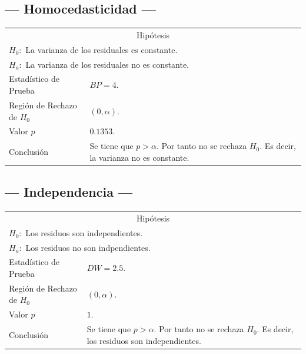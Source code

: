 \documentclass{article}
\begin{document}
\subsection{--- Homocedasticidad ---} %
\begin{center}
  \begin{tabular}{|l|p{8cm}|}
    \cline{1-2}
    \multicolumn{2}{|c|}{Hipótesis}\\ \cline{1-2}
    \multicolumn{2}{|l|}{\(H_0:\) La varianza de los residuales es constante.} \\ 
    \multicolumn{2}{|l|}{\(H_a:\) La varianza de los residuales no es constante.} \\ \cline{1-2}
    Estadístico de Prueba & \(BP = 4\).\\ \cline{1-2} 
		Región de Rechazo de \(H_0\) & \((0, \alpha )\).\\ \cline{1-2} 
    Valor \(p\) & \(0.1353\).\\ \cline{1-2} 
    Conclusión & Se tiene que \(p> \alpha\). \newline 
		Por tanto no se rechaza \(H_0\). \newline 
		Es decir, la varianza no es constante. \\ \cline{1-2} 
  \end{tabular}
\end{center}

\subsection{--- Independencia ---} %
\begin{center}
  \begin{tabular}{|l|p{8cm}|}
    \cline{1-2}
    \multicolumn{2}{|c|}{Hipótesis}\\ \cline{1-2}
    \multicolumn{2}{|l|}{\(H_0:\) Los residuos son independientes.} \\ 
    \multicolumn{2}{|l|}{\(H_a:\) Los residuos no son indpendientes.} \\ \cline{1-2}
    Estadístico de Prueba & \(DW = 2.5\).\\ \cline{1-2} 
		Región de Rechazo de \(H_0\) & \((0, \alpha )\).\\ \cline{1-2} 
    Valor \(p\) & \(1\).\\ \cline{1-2} 
    Conclusión & Se tiene que \(p> \alpha\). \newline 
		Por tanto no se rechaza \(H_0\). \newline 
		Es decir, los residuos son independientes.\\ \cline{1-2} 
  \end{tabular}
\end{center}
\end{document}
